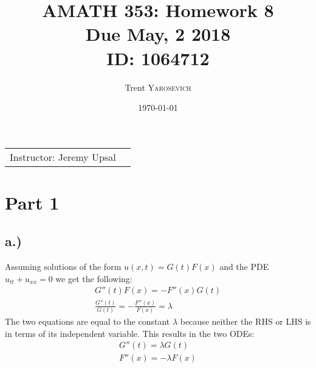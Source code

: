 \documentclass{article}
\title{AMATH 353: Homework 8 \\Due May, 2 2018 \\ ID: 1064712} %
\author{Trent \textsc{Yarosevich}} %
\date{\today} %
\begin{document}
\maketitle %
\setlength\parindent{1cm}

\begin{center}
\begin{tabular}{l r}
Instructor: Jeremy Upsal %
\end{tabular}
\end{center}


\section*{Part 1} 
\subsection*{a.)}
Assuming solutions of the form $u(x,t) = G(t)F(x)$ and the PDE $u_{tt} + u_{xx} = 0$ we get the following:
\begin{equation}
\begin{aligned}
G''(t)F(x) = -F''(x)G(t)\\
\frac{G''(t)}{G(t)} = -\frac{F''(x)}{F(x)} = \lambda
\end{aligned}
\end{equation}
The two equations are equal to the constant $\lambda $ because neither the RHS or LHS is in terms of its independent variable. This results in the two ODEs:
\begin{equation}
\begin{aligned}
G''(t) = \lambda G(t)\\
F''(x) = - \lambda F(x)
\end{aligned}
\end{equation}
\end{document}
